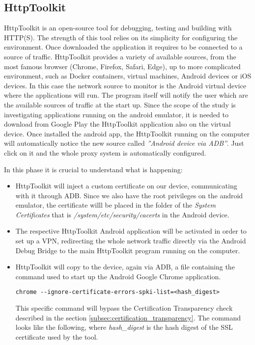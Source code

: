		\subsection{HttpToolkit}
		\label{sec:http_toolkit}
			\par HttpToolkit\cite{http_toolkit} is an open-source tool for debugging, testing and building with HTTP(S). The strength of this tool relies on its simplicity for configuring the environment. Once downloaded the application it requires to be connected to a source of traffic. HttpToolkit provides a variety of available sources, from the most famous browser (Chrome, Firefox, Safari, Edge), up to more complicated environment, such as Docker containers, virtual machines, Android devices or iOS devices. In this case the network source to monitor is the Android virtual device where the applications will run. The program itself will notify the user which are the available sources of traffic at the start up. Since the scope of the study is investigating applications running on the android emulator, it is needed to download from Google Play the HttpToolkit application also on the virtual device. Once installed the android app, the HttpToolkit running on the computer will automatically notice the new source called \textit{''Android device via ADB''}. Just click on it and the whole proxy system is automatically configured. \newline
			\par In this phase it is crucial to understand what is happening:
			\begin{itemize}
				\item HttpToolkit will inject a custom certificate on our device, communicating with it through ADB. Since we also have the root privileges on the android emulator, the certificate willl be placed in the folder of the \textit{System Certificates} that is \textit{/system/etc/security/cacerts} in the Android device. \newline
				\item The respective HttpToolkit Android application will be activated in order to set up a VPN, redirecting the whole network traffic directly via the Android Debug Bridge to the main HttpToolkit program running on the computer. \newline
				\item HttpToolkit will copy to the device, again via ADB, a file containing the command used to start up the Android Google Chrome application. 
\begin{lstlisting}
chrome --ignore-certificate-errors-spki-list=<hash_digest>
\end{lstlisting}
This specific command will bypass the Certification Transparency check described in the section \ref{subsec:certification_transparency}. The command looks like the following, where \textit{hash\_digest} is the hash digest of the SSL certificate used by the tool.\newline
			\end{itemize} 
			
